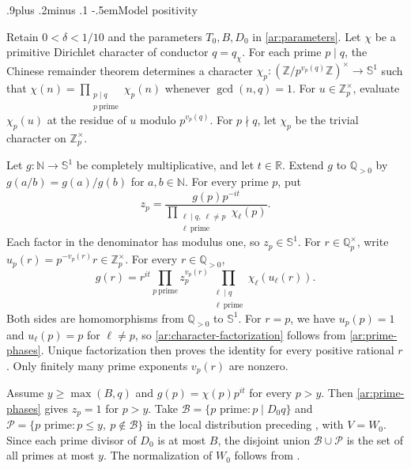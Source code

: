 \documentclass[twoside]{aomart}
\makeatletter
\theoremstyle{paperplain}
\theoremstyle{paperdefinition}
\renewcommand\subsection{\@startsection{subsection}{2}{\z@}
  {.9\baselineskip plus .2\baselineskip minus .1\baselineskip}
  {-.5em}{\normalfont\bfseries}}
\newcommand{\Z}{\mathbb Z}
\newcommand{\N}{\mathbb N}
\newcommand{\Q}{\mathbb Q}
\newcommand{\R}{\mathbb R}
\numberwithin{equation}{section}
\makeatother
\begin{document}
\subsection{Model positivity}

Retain $0<\delta<1/10$ and the parameters $T_0,B,D_0$ in
\eqref{ar:parameters}. Let $\chi$ be a primitive Dirichlet character
of conductor $q=q_\chi$.
For each prime $p\mid q$, the Chinese remainder theorem determines
a character $\chi_p:(\Z/p^{v_p(q)}\Z)^\times\to\mathbb S^1$ such that
$\displaystyle\chi(n)=\prod_{\substack{p\mid q\\p\ \mathrm{prime}}}\chi_p(n)$ whenever $\gcd(n,q)=1$.
For $u\in\Z_p^\times$, evaluate $\chi_p(u)$ at the residue of $u$
modulo $p^{v_p(q)}$. For $p\nmid q$, let $\chi_p$ be the trivial
character on $\Z_p^\times$.

Let $g:\N\to\mathbb S^1$ be completely multiplicative, and let
$t\in\R$. Extend $g$ to $\Q_{>0}$ by $g(a/b)=g(a)/g(b)$ for
$a,b\in\N$. For every prime $p$, put
\begin{equation}
 z_p=\frac{g(p)p^{-it}}
 {\displaystyle\prod_{\substack{\ell\mid q,\ \ell\ne p\\\ell\ \mathrm{prime}}}\chi_\ell(p)}.
 \label{ar:prime-phases}
\end{equation}
Each factor in the denominator has modulus one, so $z_p\in\mathbb S^1$.
For $r\in\Q_p^\times$, write
$u_p(r)=p^{-v_p(r)}r\in\Z_p^\times$.
For every $r\in\Q_{>0}$,
\begin{equation}
 g(r)=r^{it}\prod_{p\ \mathrm{prime}}z_p^{v_p(r)}
       \prod_{\substack{\ell\mid q\\\ell\ \mathrm{prime}}}\chi_\ell(u_\ell(r)).
 \label{ar:character-factorization}
\end{equation}
Both sides are homomorphisms from $\Q_{>0}$ to $\mathbb S^1$.
For $r=p$, we have $u_p(p)=1$ and $u_\ell(p)=p$ for $\ell\ne p$,
so \eqref{ar:character-factorization} follows from
\eqref{ar:prime-phases}. Unique factorization then proves the identity
for every positive rational $r$. Only finitely many prime exponents
$v_p(r)$ are nonzero.

Assume $y\ge\max(B,q)$ and $g(p)=\chi(p)p^{it}$ for every $p>y$.
Then \eqref{ar:prime-phases} gives $z_p=1$ for $p>y$.
Take $\mathcal B=\{p\text{ prime}:p\mid D_0q\}$ and
$\mathcal P=\{p\text{ prime}:p\le y,\ p\notin\mathcal B\}$ in the local distribution
preceding , with $V=W_0$.
Since each prime divisor of $D_0$ is at most $B$, the disjoint union
$\mathcal B\cup\mathcal P$ is the set of all primes at most $y$.
The normalization of $W_0$ follows from .
\end{document}
